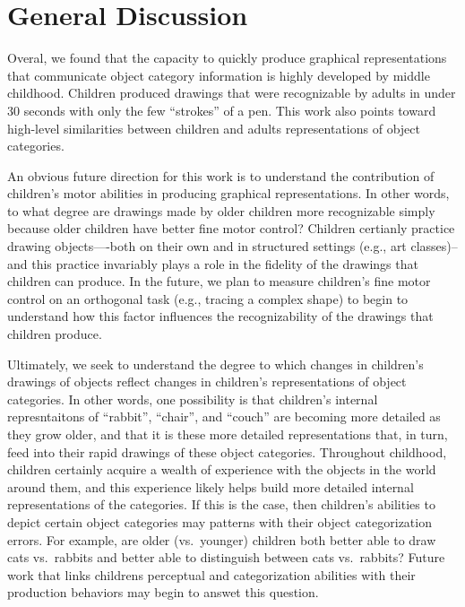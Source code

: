 \documentclass[10pt, letterpaper]{article}
\begin{document}
\section{General Discussion}\label{general-discussion}

Overal, we found that the capacity to quickly produce graphical
representations that communicate object category information is highly
developed by middle childhood. Children produced drawings that were
recognizable by adults in under 30 seconds with only the few ``strokes''
of a pen. This work also points toward high-level similarities between
children and adults representations of object categories.

An obvious future direction for this work is to understand the
contribution of children's motor abilities in producing graphical
representations. In other words, to what degree are drawings made by
older children more recognizable simply because older children have
better fine motor control? Children certianly practice drawing
objects----both on their own and in structured settings (e.g., art
classes)--and this practice invariably plays a role in the fidelity of
the drawings that children can produce. In the future, we plan to
measure children's fine motor control on an orthogonal task (e.g.,
tracing a complex shape) to begin to understand how this factor
influences the recognizability of the drawings that children produce.

Ultimately, we seek to understand the degree to which changes in
children's drawings of objects reflect changes in children's
representations of object categories. In other words, one possibility is
that children's internal represntaitons of ``rabbit'', ``chair'', and
``couch'' are becoming more detailed as they grow older, and that it is
these more detailed representations that, in turn, feed into their rapid
drawings of these object categories. Throughout childhood, children
certainly acquire a wealth of experience with the objects in the world
around them, and this experience likely helps build more detailed
internal representations of the categories. If this is the case, then
children's abilities to depict certain object categories may patterns
with their object categorization errors. For example, are older
(vs.~younger) children both better able to draw cats vs.~rabbits and
better able to distinguish between cats vs.~rabbits? Future work that
links childrens perceptual and categorization abilities with their
production behaviors may begin to answet this question.
\end{document}
